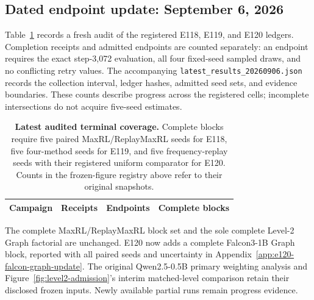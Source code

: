 
\subsection{Dated endpoint update: September 6, 2026}
\label{app:latest-results-update}

Table~\ref{tab:latest-results-update} records a fresh audit of the registered
E118, E119, and E120 ledgers. Completion receipts and admitted endpoints are
counted separately: an endpoint requires the exact step-3,072 evaluation,
all four fixed-seed sampled draws, and no conflicting retry values. The
accompanying \texttt{latest\_results\_20260906.json} records the collection
interval, ledger hashes, admitted seed sets, and evidence boundaries.
These counts describe progress across the registered cells; incomplete
intersections do not acquire five-seed estimates.

\begin{table}[H]
  \centering
  \caption{\textbf{Latest audited terminal coverage.}
  Complete blocks require five paired MaxRL/ReplayMaxRL seeds for E118,
  five four-method seeds for E119, and five frequency-replay seeds with
  their registered uniform comparator for E120. Counts in the frozen-figure
  registry above refer to their original snapshots.}
  \label{tab:latest-results-update}
  \small
  \setlength{\tabcolsep}{5pt}
  \begin{tabular}{@{}lrrr@{}}
    \toprule
    \textbf{Campaign} & \textbf{Receipts} & \textbf{Endpoints}
      & \textbf{Complete blocks} \\
    \midrule
    
  \end{tabular}
\end{table}

The complete MaxRL/ReplayMaxRL block set and the sole complete Level-2
Graph factorial are unchanged. E120 now adds a complete Falcon3-1B Graph
block, reported with all paired seeds and uncertainty in
Appendix~\ref{app:e120-falcon-graph-update}. The original Qwen2.5-0.5B
primary weighting analysis and Figure~\ref{fig:level2-admission}'s interim
matched-level comparison retain their disclosed frozen inputs. Newly
available partial runs remain progress evidence.

